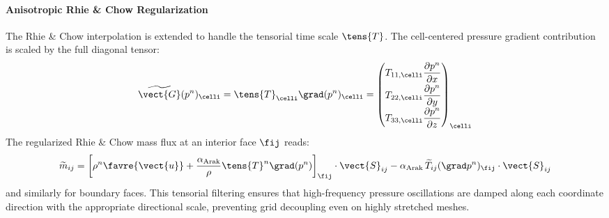 \paragraph{Anisotropic Rhie \& Chow Regularization}
The Rhie \& Chow interpolation is extended to handle the tensorial time scale
$\tens{T}$. The cell-centered pressure gradient contribution is scaled by the full
diagonal tensor:
\begin{equation}
  \widetilde{\vect{G}}(p^n)_\celli = \tens{T}_\celli \grad(p^n)_\celli
  = \begin{pmatrix}
    T_{11,\celli} \dfrac{\partial p^n}{\partial x} \\[6pt]
    T_{22,\celli} \dfrac{\partial p^n}{\partial y} \\[6pt]
    T_{33,\celli} \dfrac{\partial p^n}{\partial z}
  \end{pmatrix}_\celli
\end{equation}
The regularized Rhie \& Chow mass flux at an interior face $\fij$ reads:
\begin{equation}
  \widetilde{m}_{ij} = \left[ \rho^n \favre{\vect{u}} + \frac{\alpha_{\text{Arak}}}{\rho} \tens{T}^n \grad(p^n) \right]_{\fij} \cdot \vect{S}_{ij}
  - \alpha_{\text{Arak}} \, \widetilde{T}_{ij} (\grad p^n)_{\fij} \cdot \vect{S}_{ij}
\end{equation}
and similarly for boundary faces.
This tensorial filtering ensures that high-frequency pressure oscillations are
damped along each coordinate direction with the appropriate directional scale,
preventing grid decoupling even on highly stretched meshes.

